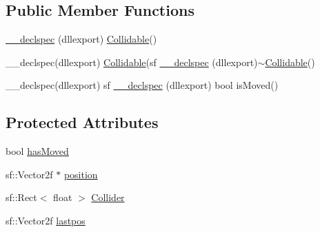 \subsection*{Public Member Functions}
\begin{DoxyCompactItemize}
\item 
\hyperlink{class_collidable_ae0db0fe1eaeab29564d641d4cb2904b7}{\-\_\-\-\_\-declspec} (dllexport) \hyperlink{class_collidable}{Collidable}()
\item 
\-\_\-\-\_\-declspec(dllexport) \hyperlink{class_collidable}{Collidable}(sf \hyperlink{class_collidable_ab232f4b0ae1feb56a177f47311c60473}{\-\_\-\-\_\-declspec} (dllexport)$\sim$\hyperlink{class_collidable}{Collidable}()
\item 
\-\_\-\-\_\-declspec(dllexport) sf \hyperlink{class_collidable_a2116894511c75bdea4a8c939ddd93061}{\-\_\-\-\_\-declspec} (dllexport) bool is\-Moved()
\end{DoxyCompactItemize}
\subsection*{Protected Attributes}
\begin{DoxyCompactItemize}
\item 
bool \hyperlink{class_collidable_afe5442fd3a82abe62b95e93248d5f4a1}{has\-Moved}
\item 
sf\-::\-Vector2f $\ast$ \hyperlink{class_collidable_aa6c2e113d920df8c0d5da2a244f924bd}{position}
\item 
sf\-::\-Rect$<$ float $>$ \hyperlink{class_collidable_a474de18f0027a4e089be1097f6d7bcc7}{Collider}
\item 
sf\-::\-Vector2f \hyperlink{class_collidable_ae50dbf8f9d1f584d3a5d5c3445fbe786}{lastpos}
\end{DoxyCompactItemize}


